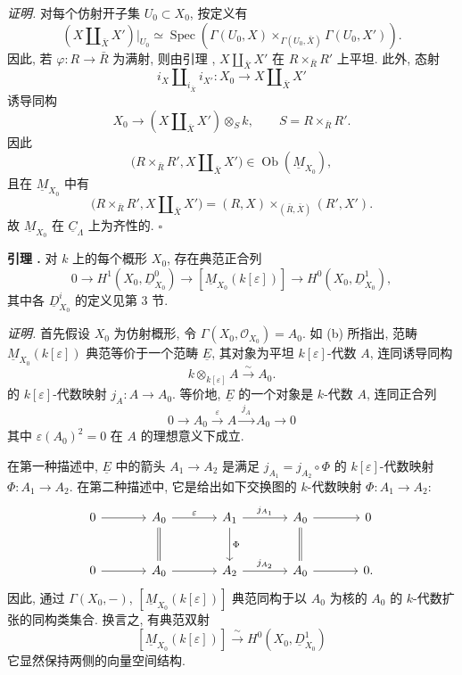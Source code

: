 \medskip
\noindent\textit{证明.}
对每个仿射开子集 $U_0\subset X_0$, 按定义有
\[
 (X\amalg_{\bar X}X')|_{U_0}
 \simeq
 \operatorname{Spec}\!\left(
   \Gamma(U_0,X)
   \times_{\Gamma(U_0,\bar X)}
   \Gamma(U_0,X')
 \right).
\]
因此, 若 $\varphi:R\longrightarrow\bar R$ 为满射, 则由引理 , $X\amalg_{\bar X}X'$ 在 $R\times_{\bar R}R'$ 上平坦. 此外, 态射
\[
 i_X\amalg_{i_{\bar X}}i_{X'}:
 X_0\longrightarrow X\amalg_{\bar X}X'
\]
诱导同构
\[
 X_0\longrightarrow (X\amalg_{\bar X}X')\otimes_Sk,
 \qquad S=R\times_{\bar R}R'.
\]
因此
\[
 \bigl(R\times_{\bar R}R',X\amalg_{\bar X}X'\bigr)
 \in\operatorname{Ob}(\underline M_{X_0}),
\]
且在 $\underline M_{X_0}$ 中有
\[
 \bigl(R\times_{\bar R}R',X\amalg_{\bar X}X'\bigr)
 =
 (R,X)\times_{(\bar R,\bar X)}(R',X').
\]
故 $\underline M_{X_0}$ 在 $\underline C_\Lambda$ 上为齐性的. \hfill$\square$




\medskip
\noindent\textbf{引理 .}
对 $k$ 上的每个概形 $X_0$, 存在典范正合列
\[
0\longrightarrow H^1(X_0,\underline D^0_{X_0})
\longrightarrow[\underline M_{X_0}(k[\varepsilon])]
\longrightarrow H^0(X_0,\underline D^1_{X_0}),
\]
其中各 $\underline D^i_{X_0}$ 的定义见第 3 节.

\medskip
\noindent\textit{证明.}
首先假设 $X_0$ 为仿射概形, 令 $\Gamma(X_0,\mathcal O_{X_0})=A_0$. 如 (b) 所指出, 范畴 $\underline M_{X_0}(k[\varepsilon])$ 典范等价于一个范畴 $\underline E$, 其对象为平坦 $k[\varepsilon]$-代数 $A$, 连同诱导同构
\[
k\otimes_{k[\varepsilon]}A\xrightarrow{\ \sim\ }A_0.
\]
的 $k[\varepsilon]$-代数映射 $j_A:A\longrightarrow A_0$. 等价地, $\underline E$ 的一个对象是 $k$-代数 $A$, 连同正合列
\[
0\longrightarrow A_0\xrightarrow{\ \varepsilon\ }A
\xrightarrow{\ j_A\ }A_0\longrightarrow0
\]
其中 $\varepsilon(A_0)^2=0$ 在 $A$ 的理想意义下成立.

在第一种描述中, $\underline E$ 中的箭头 $A_1\longrightarrow A_2$ 是满足 $j_{A_1}=j_{A_2}\circ\Phi$ 的 $k[\varepsilon]$-代数映射 $\Phi:A_1\longrightarrow A_2$. 在第二种描述中, 它是给出如下交换图的 $k$-代数映射 $\Phi:A_1\longrightarrow A_2$:
\[
\begin{tikzcd}[column sep=large,row sep=large]
0 \arrow[r]
& A_0 \arrow[r,"\varepsilon"] \arrow[d,equal]
& A_1 \arrow[r,"j_{A_1}"] \arrow[d,"\Phi"]
& A_0 \arrow[r] \arrow[d,equal]
& 0 \\
0 \arrow[r]
& A_0 \arrow[r]
& A_2 \arrow[r,"j_{A_2}"]
& A_0 \arrow[r]
& 0.
\end{tikzcd}
\]
因此, 通过 $\Gamma(X_0,-)$, $[\underline M_{X_0}(k[\varepsilon])]$ 典范同构于以 $A_0$ 为核的 $A_0$ 的 $k$-代数扩张的同构类集合. 换言之, 有典范双射
\[
[\underline M_{X_0}(k[\varepsilon])]
\xrightarrow{\ \sim\ }H^0(X_0,\underline D^1_{X_0})
\]
它显然保持两侧的向量空间结构.

